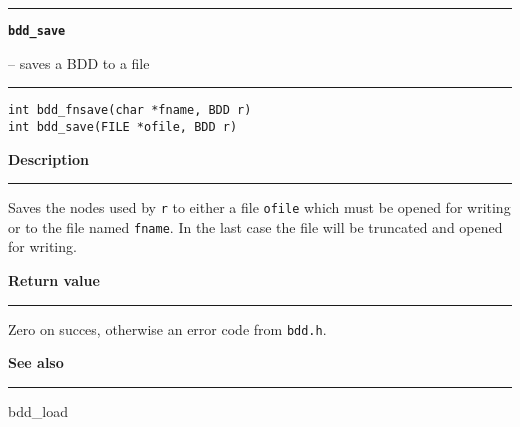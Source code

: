 \begin{minipage}{\textwidth}

\noindent\begin{minipage}{\textwidth}
\rule{\textwidth}{0.5mm}
{\tt\bf bdd\_save }
\--- saves a BDD to a file  \hspace{\fill}
\\\rule[1.5ex]{\textwidth}{0.5mm}
\end{minipage}

\noindent\begin{verbatim}
int bdd_fnsave(char *fname, BDD r)
int bdd_save(FILE *ofile, BDD r) 
\end{verbatim}

\vspace{\parsep}\noindent
{\bf Description}\\\rule[1.5ex]{\textwidth}{0.2mm}\vspace{-1.5ex}\setlength{\parindent}{1em}
Saves the nodes used by {\tt r} to either a file {\tt ofile}
           which must be opened for writing or to the file named {\tt fname}.
	   In the last case the file will be truncated and opened for
	   writing. 

\setlength{\parindent}{0em}\vspace{\parsep}\vspace{\baselineskip}\noindent
{\bf Return value}\\\rule[1.5ex]{\textwidth}{0.2mm}\vspace{-1.5ex}
Zero on succes, otherwise an error code from {\tt bdd.h}. 

\vspace{\parsep}\vspace{\baselineskip}\noindent
{\bf See also}\\\rule[1.5ex]{\textwidth}{0.2mm}\vspace{-1.5ex}
bdd\_load 
\end{minipage}
\vspace{8ex}
